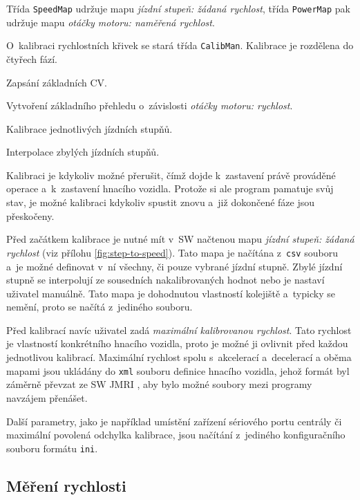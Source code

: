 Třída \texttt{SpeedMap} udržuje mapu \textit{jízdní stupeň: žádaná rychlost},
třída \texttt{PowerMap} pak udržuje mapu \textit{otáčky motoru: naměřená rychlost}.

O~kalibraci rychlostních křivek se stará třída \texttt{CalibMan}. Kalibrace
je rozdělena do čtyřech fází.

\begin{compactenum}
\item Zapsání základních CV.
\item Vytvoření základního přehledu o~závislosti \textit{otáčky motoru: rychlost}.
\item Kalibrace jednotlivých jízdních stupňů.
\item Interpolace zbylých jízdních stupňů.
\end{compactenum}

Kalibraci je kdykoliv možné přerušit, čímž dojde k~zastavení právě prováděné
operace a~k~zastavení hnacího vozidla. Protože si ale program pamatuje svůj
stav, je možné kalibraci kdykoliv spustit znovu a~již dokončené fáze jsou
přeskočeny.

Před začátkem kalibrace je nutné mít v~SW načtenou mapu \textit{jízdní
stupeň: žádaná rychlost} (viz přílohu \ref{fig:step-to-speed}). Tato mapa je
načítána z~\texttt{csv} souboru a~je možné definovat v~ní všechny, či pouze
vybrané jízdní stupně. Zbylé jízdní stupně se interpolují ze sousedních
nakalibrovaných hodnot nebo je nastaví uživatel manuálně. Tato mapa je
dohodnutou vlastností kolejiště a~typicky se nemění, proto se načítá z~jediného
souboru.

Před kalibrací navíc uživatel zadá \textit{maximální kalibrovanou rychlost}.
Tato rychlost je vlastností konkrétního hnacího vozidla, proto je možné ji
ovlivnit před každou jednotlivou kalibrací. Maximální rychlost spolu
s~akcelerací a~decelerací a oběma mapami jsou ukládány do \texttt{xml} souboru
definice hnacího vozidla, jehož formát byl záměrně převzat ze SW JMRI
\cite{jmri:web}, aby bylo možné soubory mezi programy navzájem přenášet.

Další parametry, jako je například umístění zařízení sériového portu centrály
či maximální povolená odchylka kalibrace, jsou načítání z~jediného
konfiguračního souboru formátu \texttt{ini}.

\subsection{Měření rychlosti}
\label{sec:ac:lt-measure}

